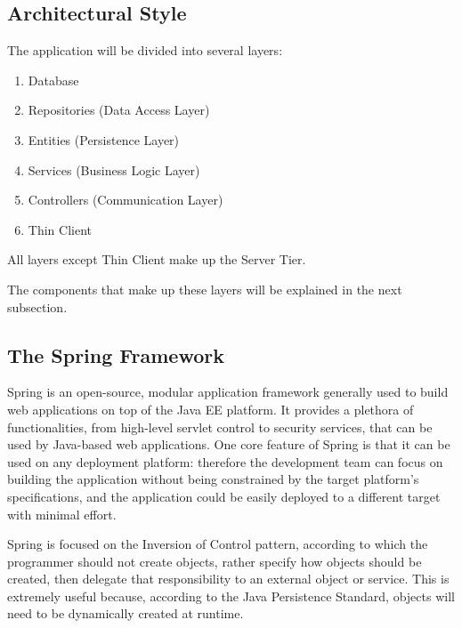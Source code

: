 \documentclass[12pt]{article}
\begin{document}
\subsection{Architectural Style}
The application will be divided into several layers:
\begin{enumerate}
	\item Database
	\item Repositories (Data Access Layer)
	\item Entities (Persistence Layer)
	\item Services (Business Logic Layer)
	\item Controllers (Communication Layer)
	\item Thin Client
\end{enumerate}
All layers except Thin Client make up the Server Tier.

The components that make up these layers will be explained in the next subsection.

\subsection{The Spring Framework}
\label{Spring}
Spring is an open-source, modular application framework generally used to build web applications on top of the Java EE platform. It provides a plethora of functionalities, from high-level servlet control to security services, that can be used by Java-based web applications. One core feature of Spring is that it can be used on any deployment platform: therefore the development team can focus on building the application without being constrained by the target platform's specifications, and the application could be easily deployed to a different target with minimal effort.

Spring is focused on the Inversion of Control pattern, according to which the programmer should not create objects, rather specify how objects should be created, then delegate that responsibility to an external object or service. This is extremely useful because, according to the Java Persistence Standard, objects will need to be dynamically created at runtime.
\end{document}
